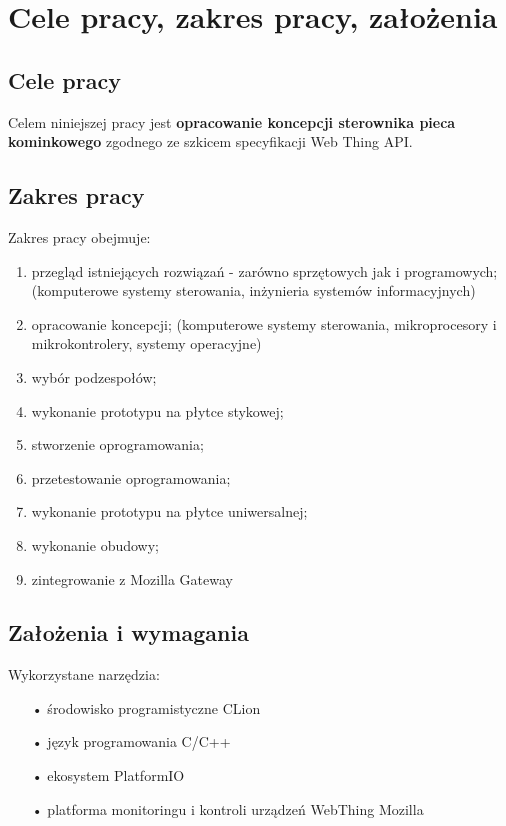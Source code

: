 \documentclass[11pt]{report}
\begin{document}
 \chapter{Cele pracy, zakres pracy, założenia}

 \section{Cele pracy}
 Celem niniejszej pracy jest \textbf{opracowanie koncepcji sterownika pieca kominkowego} zgodnego ze szkicem specyfikacji Web Thing API.
 
 \section{Zakres pracy}
 Zakres pracy obejmuje:
 \begin{enumerate}
 \item przegląd istniejących rozwiązań - zarówno sprzętowych jak i programowych; (komputerowe systemy sterowania, inżynieria systemów informacyjnych)
 \item opracowanie koncepcji; (komputerowe systemy sterowania, mikroprocesory i mikrokontrolery, systemy operacyjne)
 \item wybór podzespołów;
 \item wykonanie prototypu na płytce stykowej;
 \item stworzenie oprogramowania;
 \item przetestowanie oprogramowania; 
 \item wykonanie prototypu na płytce uniwersalnej;
 \item wykonanie obudowy;
 \item zintegrowanie z Mozilla Gateway
 \end{enumerate}
 
 \section{Założenia i wymagania}
 
 Wykorzystane narzędzia:
 \begin{enumerate}
 \item[•] środowisko programistyczne CLion
 \item[•] język programowania C/C++
 \item[•] ekosystem PlatformIO
 \item[•] platforma monitoringu i kontroli urządzeń WebThing Mozilla
 \end{enumerate}
 
\end{document}
